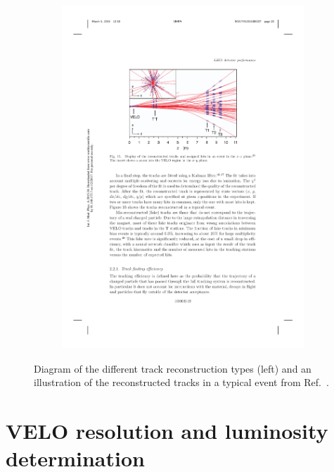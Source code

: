 \begin{figure}[!h]
\begin{subfigure}[t]{0.4\textwidth}
        \includegraphics[width=1.0\textwidth]{figs/Detector/reco_track_reco.pdf}
    \end{subfigure}
    \caption{Diagram of the different track reconstruction types (left) and an illustration of the reconstructed tracks in a typical event from Ref.~\cite{LHCb-DP-2014-002}.}
    \label{fig:Dec_reco_tracks}   
\end{figure}

\section{VELO resolution and luminosity determination}
